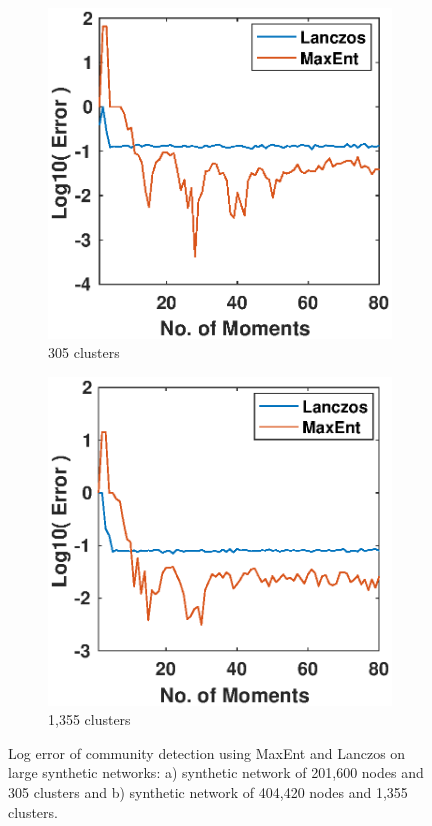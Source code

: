 \documentclass[letterpaper]{article} %
\begin{document}
\begin{figure}
	\centering
	\begin{subfigure}
		\centering
		\includegraphics[trim=0cm 0cm 0.1cm 0.0cm, clip, width=1.0\linewidth]{Figures/SynNet_n=201600_c=305.eps}
		\caption{305 clusters}
		\label{subfig:emailerror1}	
	\end{subfigure}%
	\begin{subfigure}
		\centering
		\includegraphics[trim=0cm 0cm 0.1cm 0.0cm, clip, width=1.0\linewidth]{Figures/SynNet_c_1355_n_404420.eps}
		\caption{1,355 clusters}
		\label{subfig:emailerror2}	
	\end{subfigure}%
	\caption{Log error of community detection using MaxEnt and Lanczos on large synthetic networks: a) synthetic network of  201,600 nodes and 305 clusters and b) synthetic network of 404,420 nodes and 1,355 clusters.}
	\label{fig:largeSyntheNet}	
\end{figure} 
\end{document}

